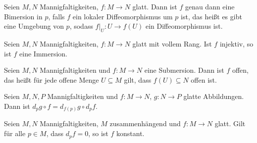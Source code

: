 \begin{korollar}[Umkehrsatz]
  Seien $M,N$ Mannigfaltigkeiten, $f\colon M \to N$ glatt. Dann ist
  $f$ genau dann eine Bimersion in $p$, falls $f$ ein lokaler
  Diffeomorphismus um $p$ ist, das heißt es gibt eine Umgebung von
  $p$, sodass $f|_U\colon U \to f(U)$ ein Diffeomorphismus ist. 
\end{korollar}

\begin{proposition}
  Seien $M,N$ Mannigfaltigkeiten, $f\colon M \to N$ glatt mit vollem
  Rang. Ist $f$ injektiv, so ist $f$ eine Immersion.
\end{proposition}

\begin{proposition}
  Seien $M,N$ Mannigfaltigkeiten und $f\colon M \to N$ eine
  Submersion. Dann ist $f$ offen, das heißt für jede offene Menge
  $U\subseteq M$ gilt, dass $f(U) \subseteq N$ offen ist.
\end{proposition}

\begin{proposition}
  Seien $M,N,P$ Mannigfaltigkeiten und $f\colon M\to N$, $g\colon N
  \to P$ glatte Abbildungen. Dann ist $d_p g\circ f = d_{f(p)}g \circ d_pf$.
\end{proposition}

\begin{proposition}
  Seien $M,N$ Mannigfaltigkeiten, $M$ zusammenhängend und $f\colon M
  \to N$ glatt. Gilt für
  alle $p\in M$, dass $d_pf = 0$, so ist $f$ konstant. 
\end{proposition}

